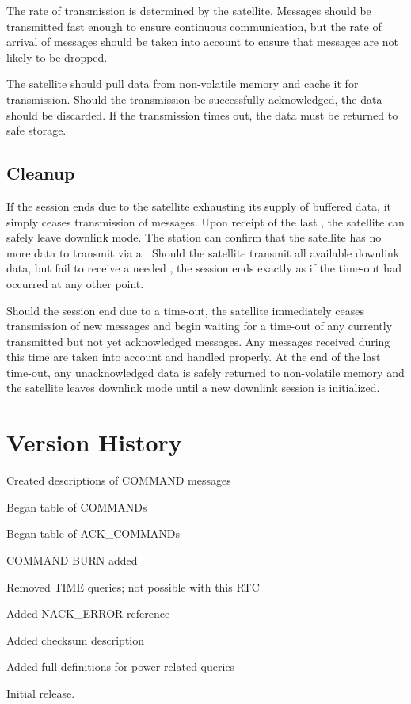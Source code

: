 \documentclass{article}
\begin{document}
  The rate of transmission is determined by the satellite. Messages should be
  transmitted fast enough to ensure continuous communication, but the rate of 
  arrival of \madownlink messages should be taken into account to ensure that
  messages are not likely to be dropped.
  
  The satellite should pull data from non-volatile memory and cache it for
  transmission. Should the transmission be successfully acknowledged, the
  data should be discarded. If the transmission times out, the data must be 
  returned to safe storage.  
  
  \subsection{Cleanup}
    If the session ends due to the satellite exhausting its supply of buffered
    data, it simply ceases transmission of \mdownlink messages. Upon receipt of 
    the last \madownlink, the satellite can safely leave downlink mode. The
    station can confirm that the satellite has no more data to transmit via a 
    \mquery. Should the satellite transmit all available downlink data, but
    fail to receive a needed \madownlink, the session ends exactly as if the
    time-out had occurred at any other point.
    
    Should the session end due to a time-out, the satellite immediately ceases
    transmission of new \mdownlink messages and begin waiting for a time-out of
    any currently transmitted but not yet acknowledged messages. Any \madownlink
    messages received during this time are taken into account and handled
    properly. At the end of the last time-out, any unacknowledged data is safely
    returned to non-volatile memory and the satellite leaves downlink mode until
    a new downlink session is initialized.

\section{Version History}


Created descriptions of COMMAND messages

Began table of COMMANDs

Began table of ACK\_COMMANDs

COMMAND BURN added

Removed TIME queries; not possible with this RTC

Added NACK\_ERROR reference

Added checksum description

Added full definitions for power related queries


Initial release.

    
\end{document}
